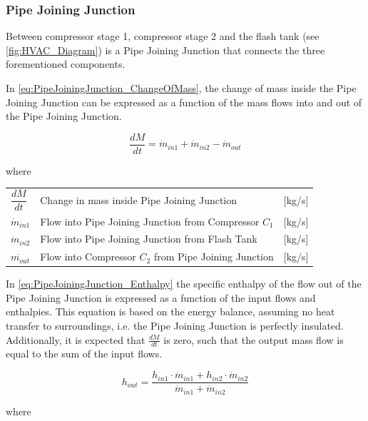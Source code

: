 \subsubsection{Pipe Joining Junction}
Between compressor stage 1, compressor stage 2 and the flash tank (see \cref{fig:HVAC_Diagram}) is a Pipe Joining Junction that connects the three forementioned components.

In \cref{eq:PipeJoiningJunction_ChangeOfMass}, the change of mass inside the Pipe Joining Junction can be expressed as a function of the mass flows into and out of the Pipe Joining Junction.

\begin{equation} \label{eq:PipeJoiningJunction_ChangeOfMass}
	\frac{dM}{dt} = \dot{m}_{in1} + \dot{m}_{in2} - \dot{m}_{out}
\end{equation}


where

\begin{center}
	\begin{tabular}{l p{8cm} l}
		$\dfrac{dM}{dt}$ & Change in mass inside Pipe Joining Junction             & [\si{kg}/\si{s}] \\
		$\dot{m}_{in1}$  & Flow into Pipe Joining Junction from Compressor $ C_1 $ & [\si{kg}/\si{s}] \\
		$\dot{m}_{in2}$  & Flow into Pipe Joining Junction from Flash Tank         & [\si{kg}/\si{s}] \\
		$\dot{m_{out}}$  & Flow into Compressor $ C_2 $ from Pipe Joining Junction & [\si{kg}/\si{s}]
	\end{tabular}
\end{center}

In \cref{eq:PipeJoiningJunction_Enthalpy} the specific enthalpy of the flow out of the Pipe Joining Junction is expressed as a function of the input flows and enthalpies. This equation is based on the energy balance, assuming no heat transfer to surroundings, i.e. the Pipe Joining Junction is perfectly insulated. Additionally, it is expected that $\frac{dM}{dt}$ is zero, such that the output mass flow is equal to the sum of the input flows.

\begin{equation} \label{eq:PipeJoiningJunction_Enthalpy}
	h_{out} = \frac{h_{in1} \cdot \dot{m}_{in1} + h_{in2} \cdot \dot{m}_{in2}}{ \dot{m}_{in1} + \dot{m}_{in2} }
\end{equation}

where

